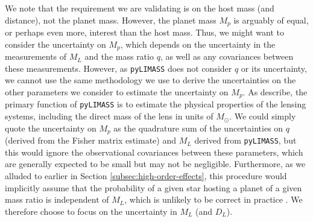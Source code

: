 \documentclass[twocolumn]{aastex631}
\begin{document}
\indent We note that the requirement we are validating is on the host mass (and distance), not the planet mass.  However, the planet mass $M_p$ is arguably of equal, or perhaps even more, interest than the host mass. Thus, we might want to consider the uncertainty on $M_p$, which depends on the uncertainty in the measurements of $M_L$ and the mass ratio $q$, as well as any covariances between these measurements. However, as \texttt{pyLIMASS} does not consider $q$ or its uncertainty, we cannot use the same methodology we use to derive the uncertainties on the other parameters we consider to estimate the uncertainty on $M_p$. As \cite{bachelet:2024a} describe, the primary function of \texttt{pyLIMASS} is to estimate the physical properties of the lensing systems, including the direct mass of the lens in units of $M_\odot$.  We could simply quote the uncertainty on $M_p$ as the quadrature sum of the uncertainties on $q$ (derived from the Fisher matrix estimate) and $M_L$ derived from \texttt{pyLIMASS}, but this would ignore the observational covariances between these parameters, which are generally expected to be small but may not be negligible. Furthermore, as we alluded to earlier in Section \ref{subsec:high-order-effects}, this procedure would implicitly assume that the probability of a given star hosting a planet of a given mass ratio is independent of $M_L$, which is unlikely to be correct in practice \citep{bennett:inprep}.  We therefore choose to focus on the uncertainty in $M_L$ (and $D_L$).
\end{document}
